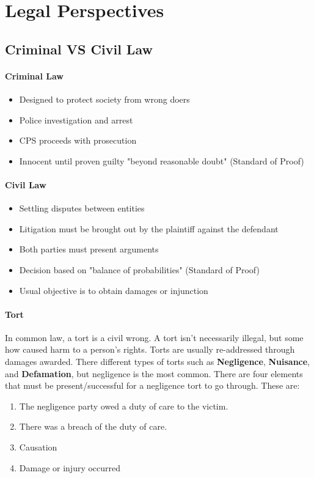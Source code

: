 \section{Legal Perspectives}
\subsection{Criminal VS Civil Law}
\paragraph{Criminal Law}
\begin{itemize}
	\item Designed to protect society from wrong doers
	\item Police investigation and arrest
	\item CPS proceeds with prosecution
	\item Innocent until proven guilty "beyond reasonable doubt" (Standard of Proof)
\end{itemize}
\paragraph{Civil Law}
\begin{itemize}
	\item Settling disputes between entities
	\item Litigation must be brought out by the plaintiff against the defendant
	\item Both parties must present arguments
	\item Decision based on "balance of probabilities" (Standard of Proof)
	\item Usual objective is to obtain damages or injunction
\end{itemize}
\paragraph{Tort} In common law, a tort is a civil wrong. A tort isn't necessarily illegal, but some how caused harm to a person's rights. Torts are usually re-addressed through damages awarded. There different types of torts such as \textbf{Negligence}, \textbf{Nuisance}, and \textbf{Defamation}, but negligence is the most common. There are four elements that must be present/successful for a negligence tort to go through. These are:
\begin{enumerate}
	\item The negligence party owed a duty of care to the victim.
	\item There was a breach of the duty of care.
	\item Causation
	\item Damage or injury occurred
\end{enumerate}
